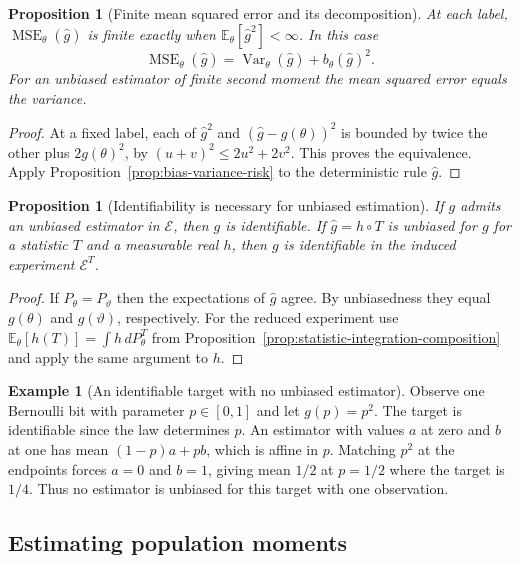 \documentclass[11pt,oneside]{book}
\newtheorem{proposition}[theorem]{Proposition}
\theoremstyle{definition}
\newtheorem{example}[theorem]{Example}
\theoremstyle{remark}
\begin{document}
\begin{proposition}[Finite mean squared error and its decomposition]
\label{prop:estimator-mse-decomposition}
At each label, $\operatorname{MSE}_\theta(\widehat g)$ is finite
exactly when $\mathbb E_\theta[\widehat g^2]<\infty$. In this case
\[
\operatorname{MSE}_\theta(\widehat g)
=\operatorname{Var}_\theta(\widehat g)+b_\theta(\widehat g)^2.
\]
For an unbiased estimator of finite second moment the mean squared
error equals the variance.
\end{proposition}
\begin{proof}
At a fixed label, each of $\widehat g^2$ and
$(\widehat g-g(\theta))^2$ is bounded by twice the other plus
$2g(\theta)^2$, by $(u+v)^2\leq2u^2+2v^2$. This proves the
equivalence. Apply Proposition~\ref{prop:bias-variance-risk} to the
deterministic rule $\widehat g$.
\end{proof}

\begin{proposition}[Identifiability is necessary for unbiased estimation]
\label{prop:unbiased-implies-identifiable}
If $g$ admits an unbiased estimator in $\mathcal E$, then $g$ is
identifiable. If $\widehat g=h\circ T$ is unbiased for $g$ for a
statistic $T$ and a measurable real $h$, then $g$ is identifiable
in the induced experiment $\mathcal E^T$.
\end{proposition}
\begin{proof}
If $P_\theta=P_\vartheta$ then the expectations of $\widehat g$ agree.
By unbiasedness they equal $g(\theta)$ and $g(\vartheta)$, respectively.
For the reduced experiment use
$\mathbb E_\theta[h(T)]=\int h\,dP_\theta^T$ from
Proposition~\ref{prop:statistic-integration-composition} and apply
the same argument to $h$.
\end{proof}

\begin{example}[An identifiable target with no unbiased estimator]
\label{ex:identifiable-no-unbiased-single-bit}
Observe one Bernoulli bit with parameter $p\in[0,1]$ and let
$g(p)=p^2$. The target is identifiable since the law determines $p$.
An estimator with values $a$ at zero and $b$ at one has mean
$(1-p)a+pb$, which is affine in $p$. Matching $p^2$ at the
endpoints forces $a=0$ and $b=1$, giving mean $1/2$ at $p=1/2$
where the target is $1/4$. Thus no estimator is unbiased for this
target with one observation.
\end{example}

\subsection{Estimating population moments}
\label{subsec:estimating-population-moments}
\end{document}
